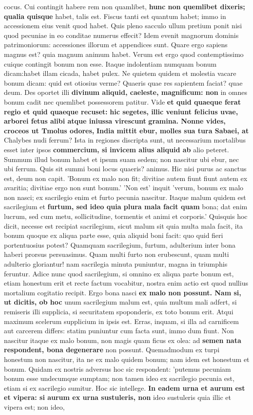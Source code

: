cocus. Cui contingit habere rem non quamlibet, \textbf{hunc non quemlibet dixeris; qualia quisque} habet, talis est. Fiscus tanti est quantum habet; immo in accessionem eius venit quod habet. Quis pleno sacculo ullum pretium ponit nisi quod pecuniae in eo conditae numerus effecit? Idem evenit magnorum dominis patrimoniorum: accessiones illorum et appendices sunt. Quare ergo sapiens magnus est? quia magnum animum habet. Verum est ergo quod contemptissimo cuique contingit bonum non esse. Itaque indolentiam numquam bonum dicam:habet illam cicada, habet pulex. Ne quietem quidem et molestia vacare bonum dicam: quid est otiosius verme? Quaeris quae res sapientem faciat? quae deum. Des oportet illi \textbf{divinum aliquid, caeleste, magnificum: non} in omnes bonum cadit nec quemlibet possessorem patitur. Vide \textbf{et quid quaeque ferat regio et quid quaeque recuset:} \textbf{hic segetes, illic veniunt felicius uvae,} \textbf{arborei fetus alibi atque iniussa virescunt} \textbf{gramina. Nonne vides, croceos ut Tmolus odores,} \textbf{\textbf{India mittit ebur, molles sua tura Sabaei,} at} Chalybes nudi ferrum? Ista in regiones discripta sunt, ut necessarium mortalibus esset inter ipsos \textbf{commercium, si invicem alius aliquid ab} alio peteret. Summum illud bonum habet et ipsum suam sedem; non nascitur ubi ebur, nec ubi ferrum. Quis sit summi boni locus quaeris? animus. Hic nisi purus ac sanctus est, deum non capit. 'Bonum ex malo non fit; divitiae autem fiunt fiunt autem ex avaritia; divitiae ergo non sunt bonum.' 'Non est' inquit 'verum, bonum ex malo non nasci; ex sacrilegio enim et furto pecunia nascitur. Itaque malum quidem est sacrilegium et \textbf{furtum, sed ideo quia plura mala facit quam} bona; dat enim lucrum, sed cum metu, sollicitudine, tormentis et animi et corporis.' Quisquis hoc dicit, necesse est recipiat sacrilegium, sicut malum sit quia multa mala facit, ita bonum quoque ex aliqua parte esse, quia aliquid boni facit: quo quid fieri portentuosius potest? Quamquam sacrilegium, furtum, adulterium inter bona haberi prorsus persuasimus. Quam multi furto non erubescunt, quam multi adulterio gloriantur! nam sacrilegia minuta puniuntur, magna in triumphis feruntur. Adice nunc quod sacrilegium, si omnino ex aliqua parte bonum est, etiam honestum erit et recte factum vocabitur, nostra enim actio est quod nullius mortalium cogitatio recipit. Ergo bona nasci \textbf{ex \textbf{malo non possunt. Nam si, ut dicitis, ob hoc}} unum sacrilegium malum est, quia multum mali adfert, si remiseris illi supplicia, si securitatem spoponderis, ex toto bonum erit. Atqui maximum scelerum supplicium in ipsis est. Erras, inquam, si illa ad carnificem aut carcerem differs: statim puniuntur cum facta sunt, immo dum fiunt. Non nascitur itaque ex malo bonum, non magis quam ficus ex olea: ad \textbf{semen nata respondent, bona degenerare} non possunt. Quemadmodum ex turpi honestum non nascitur, ita ne ex malo quidem bonum; nam idem est honestum et bonum. Quidam ex nostris adversus hoc sic respondent: 'putemus pecuniam bonum esse undecumque sumptam; non tamen ideo ex sacrilegio pecunia est, etiam si ex sacrilegio sumitur. Hoc sic intellege. \textbf{\textbf{In eadem urna et aurum \textbf{est et vipera: si aurum} ex} urna sustuleris, non} ideo sustuleris quia illic et vipera est; non ideo, 